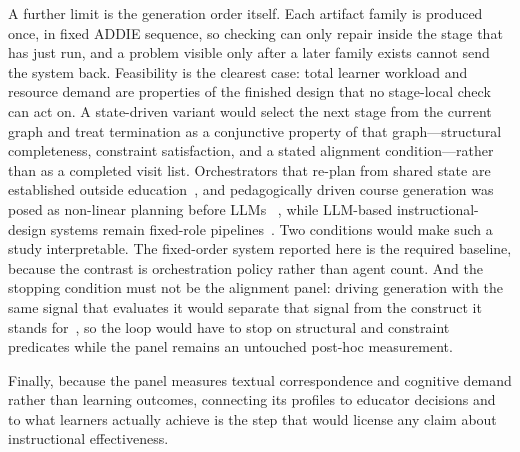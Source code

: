 A further limit is the generation order itself. Each artifact family is produced
once, in fixed ADDIE sequence, so checking can only repair inside the stage that has
just run, and a problem visible only after a later family exists cannot send the
system back. Feasibility is the clearest case: total learner workload and resource
demand are properties of the finished design that no stage-local check can act on. A
state-driven variant would select the next stage from the current graph and treat
termination as a conjunctive property of that graph---structural completeness,
constraint satisfaction, and a stated alignment condition---rather than as a
completed visit list. Orchestrators that re-plan from shared state are established
outside education~\cite{fourney2024magenticone,zhang2026patchboard}, and
pedagogically driven course generation was posed as non-linear planning before LLMs
~\cite{ullrich2008paigos}, while LLM-based instructional-design systems remain
fixed-role pipelines~\cite{zhang2025eduplanner,yao2025instructionalagents,
isdagentbench}. Two conditions would make such a study interpretable. The
fixed-order system reported here is the required baseline, because the contrast is
orchestration policy rather than agent count. And the stopping condition must not be
the alignment panel: driving generation with the same signal that evaluates it would
separate that signal from the construct it stands for~\cite{gao2023scaling}, so the
loop would have to stop on structural and constraint predicates while the panel
remains an untouched post-hoc measurement.

Finally, because the panel measures textual correspondence and cognitive demand
rather than learning outcomes, connecting its profiles to educator decisions and to
what learners actually achieve is the step that would license any claim about
instructional effectiveness.
